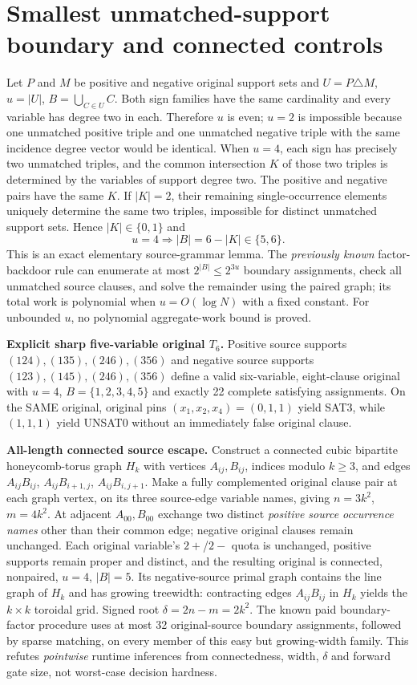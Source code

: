 \documentclass[11pt]{article}
\begin{document}
\section{Smallest unmatched-support boundary and connected controls}
Let $P$ and $M$ be positive and negative original support sets and $U=P\triangle M$, $u=|U|$, $B=\bigcup_{C\in U}C$. Both sign families have the same cardinality and every variable has degree two in each. Therefore $u$ is even; $u=2$ is impossible because one unmatched positive triple and one unmatched negative triple with the same incidence degree vector would be identical. When $u=4$, each sign has precisely two unmatched triples, and the common intersection $K$ of those two triples is determined by the variables of support degree two. The positive and negative pairs have the same $K$. If $|K|=2$, their remaining single-occurrence elements uniquely determine the same two triples, impossible for distinct unmatched support sets. Hence $|K|\in\{0,1\}$ and
\[
 u=4 \Longrightarrow |B|=6-|K|\in\{5,6\}.
\]
This is an exact elementary source-grammar lemma. The \emph{previously known} factor-backdoor rule can enumerate at most $2^{|B|}\le2^{3u}$ boundary assignments, check all unmatched source clauses, and solve the remainder using the paired graph; its total work is polynomial when $u=O(\log N)$ with a fixed constant. For unbounded $u$, no polynomial aggregate-work bound is proved.

\noindent\textbf{Explicit sharp five-variable original $T_6$.} Positive source supports $(124),(135),(246),(356)$ and negative source supports $(123),(145),(246),(356)$ define a valid six-variable, eight-clause original with $u=4$, $B=\{1,2,3,4,5\}$ and exactly 22 complete satisfying assignments. On the SAME original, original pins $(x_1,x_2,x_4)=(0,1,1)$ yield SAT3, while $(1,1,1)$ yield UNSAT0 without an immediately false original clause.

\noindent\textbf{All-length connected source escape.} Construct a connected cubic bipartite honeycomb-torus graph $H_k$ with vertices $A_{ij},B_{ij}$, indices modulo $k\ge3$, and edges $A_{ij}B_{ij}$, $A_{ij}B_{i+1,j}$, $A_{ij}B_{i,j+1}$. Make a fully complemented original clause pair at each graph vertex, on its three source-edge variable names, giving $n=3k^2$, $m=4k^2$. At adjacent $A_{00},B_{00}$ exchange two distinct \emph{positive source occurrence names} other than their common edge; negative original clauses remain unchanged. Each original variable's $2+$/$2-$ quota is unchanged, positive supports remain proper and distinct, and the resulting original is connected, nonpaired, $u=4$, $|B|=5$. Its negative-source primal graph contains the line graph of $H_k$ and has growing treewidth: contracting edges $A_{ij}B_{ij}$ in $H_k$ yields the $k\times k$ toroidal grid. Signed root $\delta=2n-m=2k^2$. The known paid boundary-factor procedure uses at most 32 original-source boundary assignments, followed by sparse matching, on every member of this easy but growing-width family. This refutes \emph{pointwise} runtime inferences from connectedness, width, $\delta$ and forward gate size, not worst-case decision hardness.
\end{document}

